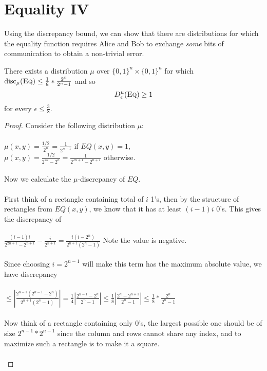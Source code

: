 \section{Equality IV}

Using the discrepancy bound, we can show that there are distributions for which the equality function requires Alice and Bob to exchange \emph{some} bits of communication to obtain a non-trivial error.

\begin{theorem}
	There exists a distribution $\mu$ over $\{0,1\}^n \times \{0,1\}^n$ for which 
	$
	\mathrm{disc}_\mu(\textsc{Eq}) \leq \frac18*\frac{2^n}{2^n-1}
	$
	and so
	\[
	D^\mu_\epsilon(\textsc{Eq}) \ge 1
	\]
	for every $\epsilon \le \frac38$.
\end{theorem}

\begin{proof}
	Consider the following distribution $\mu$: \\
	\\
	$\mu(x,y) = \frac{1/2}{2^n} = \frac{1}{2^{n+1}}$ if $EQ(x,y) = 1$,\\
	$\mu(x,y) = \frac{1/2}{2^{2n}-2^n} = \frac{1}{2^{2n+1}-2^{n+1}}$ otherwise. \\
	\\
	Now we calculate the $\mu$-discrepancy of $EQ$. \\
	\\
	First think of a rectangle containing total of $i$ 1's, then by the structure of rectangles from $EQ(x,y)$, we know that it has at least $(i-1)i$ 0's. This gives the discrepancy of \\
	\\
	$\frac{(i-1)i}{2^{2n+1}-2^{n+1}}-\frac{i}{2^{n+1}} = \frac{i(i-2^n)}{2^{n+1}(2^n-1)}$ Note the value is negative.\\
	\\
	Since choosing $i=2^{n-1}$ will make this term has the maximum absolute value, we have discrepancy\\
	\\
	$\leq |\frac{2^{n-1}(2^{n-1}-2^n)}{2^{n+1}(2^n-1)}| = \frac14|\frac{2^{n-1}-2^{n}}{2^{n}-1}| \leq \frac18|\frac{2^{n}-2^{n+1}}{2^{n}-1}| \leq \frac18*\frac{2^n}{2^n-1}$\\
	\\
	Now think of a rectangle containing only 0's, the largest possible one should be of size $2^{n-1}*2^{n-1}$ since the column and rows cannot share any index, and to maximize such a rectangle is to make it a square. \\ 
	\\

\end{proof}

